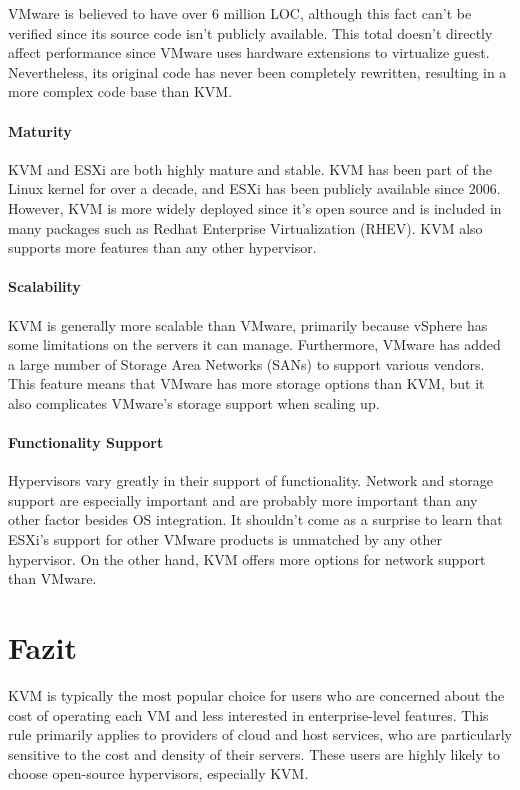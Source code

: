 \documentclass[14pt]{extreport}
\begin{document}
VMware is believed to have over 6 million LOC, although this fact can’t be verified since its source code isn’t publicly available. This total doesn’t directly affect performance since VMware uses hardware extensions to virtualize guest. Nevertheless, its original code has never been completely rewritten, resulting in a more complex code base than KVM.
\subsubsection{Maturity}

KVM and ESXi are both highly mature and stable. KVM has been part of the Linux kernel for over a decade, and ESXi has been publicly available since 2006. However, KVM is more widely deployed since it’s open source and is included in many packages such as Redhat Enterprise Virtualization (RHEV). KVM also supports more features than any other hypervisor.
\subsubsection{Scalability}

KVM is generally more scalable than VMware, primarily because vSphere has some limitations on the servers it can manage. Furthermore, VMware has added a large number of Storage Area Networks (SANs) to support various vendors. This feature means that VMware has more storage options than KVM, but it also complicates VMware’s storage support when scaling up.
\subsubsection{Functionality Support}

Hypervisors vary greatly in their support of functionality. Network and storage support are especially important and are probably more important than any other factor besides OS integration. It shouldn’t come as a surprise to learn that ESXi’s support for other VMware products is unmatched by any other hypervisor. On the other hand, KVM offers more options for network support than VMware.


\chapter{Fazit}
KVM is typically the most popular choice for users who are concerned about the cost of operating each VM and less interested in enterprise-level features. This rule primarily applies to providers of cloud and host services, who are particularly sensitive to the cost and density of their servers. These users are highly likely to choose open-source hypervisors, especially KVM.
\end{document}
